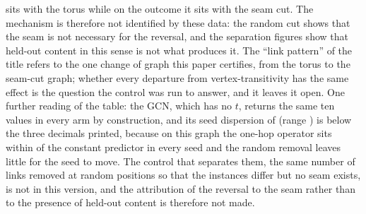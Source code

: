 \documentclass[preprint,11pt,3p]{elsarticle}
\begin{document}
{sits with the torus while on the outcome it sits with the seam cut. The mechanism is therefore
not identified by these data: the random cut shows that the seam is not necessary for the
reversal, and the separation figures show that held-out content in this sense is not what
produces it. The ``link pattern'' of the title refers to the one change of graph this paper
certifies, from the torus to the seam-cut graph; whether every departure from
vertex-transitivity has the same effect is the question the control was run to answer, and it
leaves it open. One further reading of the table: the GCN, which has no $t$, returns the same
ten values in every arm by construction, and its seed dispersion of \numRcutGcnSd{} (range
\numRcutGcnRange) is below the three decimals printed, because on this graph the one-hop
operator sits within \numRcutGcnGapToConst{} of the constant predictor in every seed and the
random removal leaves little for the seed to move. }{%
The control that separates them, the same number of links removed at random positions so that
the instances differ but no seam exists, is not in this version, and the attribution of the
reversal to the seam rather than to the presence of held-out content is therefore not made.}


\begin{table}[htbp]
\centering
\caption{Torus and seam-cut graph side by side, 1000 epochs, submitted capacity, softplus arm
with $t_{0}=0.5$: the constant predictor, the three operators (mean $\pm$ sd over valid seeds,
count in parentheses), the two first-draft fixed-reach baselines, the seed vote, the Wilcoxon
$p$ and the operator leading in mean.}
\label{tab:seam}

\end{table}
\end{document}
